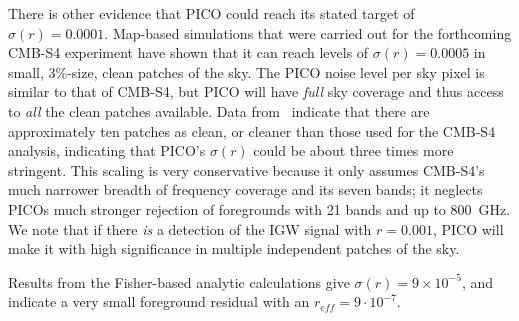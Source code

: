 \documentclass[PICOReport.tex]{subfiles}
\begin{document}
There is other evidence that PICO could reach its stated target of $\sigma(r) = 0.0001$. Map-based simulations that were carried out for the forthcoming CMB-S4 experiment have shown that it can reach levels of $\sigma(r) = 0.0005$ in small, 3\%-size, clean patches of the sky. 
The PICO noise level per sky pixel is similar to that of CMB-S4, but PICO will have {\it full} sky coverage and thus access to {\it all} the clean patches available. Data from \planck\ indicate that there are approximately ten %
patches as clean, or cleaner than those used for the CMB-S4 analysis, indicating that PICO's $\sigma(r)$ could be about three times more stringent. This scaling is very conservative because it only assumes CMB-S4's much narrower breadth of frequency coverage and its seven bands; %
it neglects PICOs much stronger rejection of foregrounds with 21 bands and up to 800~GHz.  We note that if there {\it is} a detection of the \ac{IGW} signal with $r=0.001$, PICO will make it with high significance in multiple independent patches of the sky. 

Results from the Fisher-based analytic calculations give $\sigma(r) = 9 \times 10^{-5}$, and indicate a very small foreground residual with an $r_{eff} = 9 \cdot 10^{-7}.$
\end{document}
